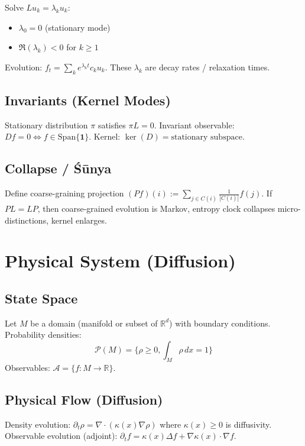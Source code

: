 \documentclass[12pt, oneside]{article}
\begin{document}
Solve $L u_k = \lambda_k u_k$:
\begin{itemize}
    \item $\lambda_0 = 0$ (stationary mode)
    \item $\Re(\lambda_k) < 0$ for $k \geq 1$
\end{itemize}
Evolution: $f_t = \sum_k e^{\lambda_k t} c_k u_k$. These $\lambda_k$ are decay rates / relaxation times.

\subsection{Invariants (Kernel Modes)}

Stationary distribution $\pi$ satisfies $\pi L = 0$. Invariant observable: $Df = 0 \iff f \in \text{Span}\{\mathbf{1}\}$. Kernel: $\ker(D) = \text{stationary subspace}$.

\subsection{Collapse / Śūnya}

Define coarse-graining projection $(Pf)(i) := \sum_{j \in C(i)} \frac{1}{|C(i)|} f(j)$. If $PL = LP$, then coarse-grained evolution is Markov, entropy clock collapses micro-distinctions, kernel enlarges.

\section{Physical System (Diffusion)}

\subsection{State Space}

Let $M$ be a domain (manifold or subset of $\mathbb{R}^d$) with boundary conditions. Probability densities:
\begin{equation}
\mathcal{P}(M) = \{\rho \geq 0, \int_M \rho \, dx = 1\}
\end{equation}
Observables: $\mathcal{A} = \{ f: M \rightarrow \mathbb{R} \}$.

\subsection{Physical Flow (Diffusion)}

Density evolution: $\partial_t \rho = \nabla \cdot (\kappa(x) \nabla \rho)$ where $\kappa(x) \geq 0$ is diffusivity. Observable evolution (adjoint): $\partial_t f = \kappa(x) \Delta f + \nabla \kappa(x) \cdot \nabla f$.
\end{document}
